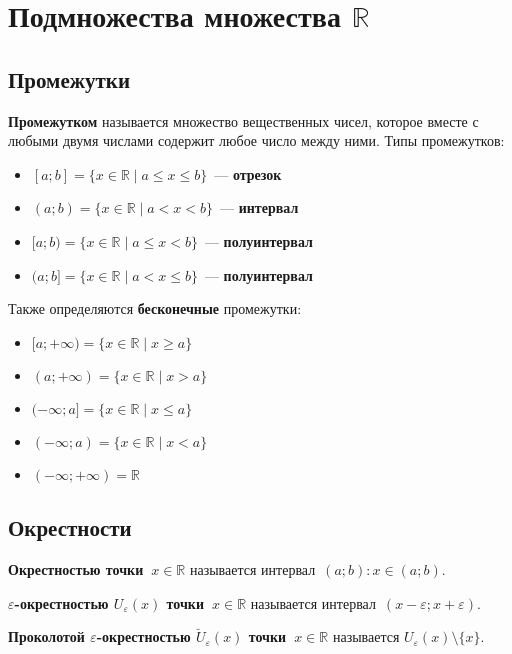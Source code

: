 \section{Подмножества множества \texorpdfstring{$\mathbb R$}{}}
\subsection{Промежутки}
 \textbf{Промежутком} называется множество вещественных чисел, которое вместе с любыми двумя числами содержит любое число между ними.
Типы промежутков:
\begin{itemize}
	\item {} $[a; b] = \{ x \in \mathbb R \mid a \leqslant x \leqslant b \}$~--- \textbf{отрезок}
	\item {} $(a; b) = \{ x \in \mathbb R \mid a < x < b \}$~--- \textbf{интервал}
	\item $[a; b) = \{ x \in \mathbb R \mid a \leqslant x < b \}$~--- \textbf{полуинтервал}
	\item $(a; b] = \{ x \in \mathbb R \mid a < x \leqslant b \}$~--- \textbf{полуинтервал}
\end{itemize}

Также определяются \textbf{бесконечные} промежутки:
\begin{itemize}
	\item $[a; +\infty) = \{ x \in \mathbb R \mid x \geqslant a \}$
	\item $(a; +\infty) = \{ x \in \mathbb R \mid x > a \}$
	\item $(-\infty; a] = \{ x \in \mathbb R \mid x \leqslant a \}$
	\item $(-\infty; a) = \{ x \in \mathbb R \mid x < a \}$
	\item $(-\infty; +\infty) = \mathbb R$
\end{itemize}

\subsection{Окрестности}
 \textbf{Окрестностью точки~$x \in \mathbb R$} называется интервал~$(a; b) \colon x \in (a; b)$.

\textbf{$\varepsilon$-окрестностью $U_\varepsilon(x)$ точки~$x \in \mathbb R$} называется интервал~$(x - \varepsilon; x + \varepsilon)$.

\textbf{Проколотой $\varepsilon$-окрестностью $\breve U_\varepsilon(x)$ точки~$x \in \mathbb R$} называется $U_\varepsilon(x) \setminus \{ x \}$.
